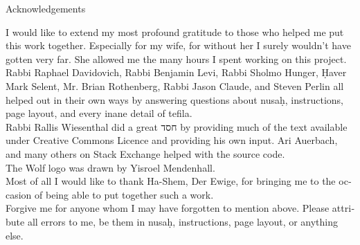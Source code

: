 \documentclass[twoside, openany, parskip=half, 11pt]{book}
\begin{document}
\begin{minipage}{\textwidth}

\begin{center} %
\begin{LARGE}
Acknowledgements
\end{LARGE}
\end{center}

\begin{english}
I would like to extend my most profound gratitude to those who helped me put this work together. Especially for my wife, for without her I surely wouldn't have gotten very far. She allowed me the many hours I spent working on this project. \\
 

Rabbi Raphael Davidovich, Rabbi Benjamin Levi, Rabbi Sholmo Hunger,  \d{H}aver Mark Selent, Mr. Brian Rothenberg, Rabbi Jason Claude, and Steven Perlin all helped out in their own ways by answering questions about nusa\d{h}, instructions, page layout, and every inane detail of tefila. \\

Rabbi Rallis Wiesenthal did a great חסד by providing much of the text available under Creative Commons Licence and providing his own input. Ari Auerbach, and many others on Stack Exchange helped with the source code. \\

The Wolf logo was drawn by Yisroel Mendenhall.\\

Most of all I would like to thank Ha-Shem, Der Ewige, for bringing me to the occasion of being able to put together such a work.\\ 

Forgive me for anyone whom I may have forgotten to mention above. Please attribute all errors to me, be them in nusa\d{h}, instructions, page layout, or anything else.\\

\end{english}

\end{minipage}





\renewcommand{\contentsname}{}
\tableofcontents

\clearpage


\blankpage
\end{document}
